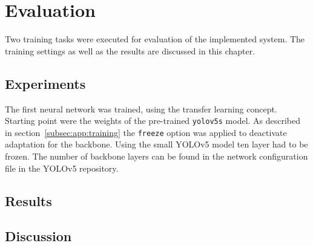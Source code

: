 \chapter{Evaluation}\label{chpt:evaluation}
\glsresetall

Two training tasks were executed for evaluation of the implemented system. The training settings as 
well as the results are discussed in this chapter.

\section{Experiments}\label{sec:eval:experiments}

The first neural network was trained, using the transfer learning concept. Starting point were the 
weights of the pre-trained \texttt{yolov5s} model. As described in section~\ref{subsec:app:training} 
the \texttt{freeze} option was applied to deactivate adaptation for the backbone. Using the small 
YOLOv5 model ten layer had to be frozen. The number of backbone layers can be found in the 
network configuration file in the YOLOv5 repository.

\section{Results}\label{sec:eval:results}

\section{Discussion}\label{sec:eval:discussion}
